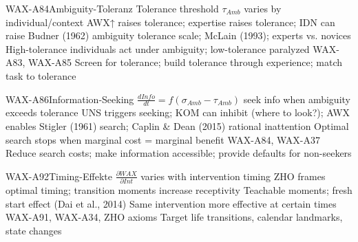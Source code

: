\begin{axiomspec}{WAX-A84}{Ambiguity-Toleranz}
 Tolerance threshold $\tau_{Amb}$ varies by individual/context
 AWX↑ raises tolerance; expertise raises tolerance; IDN can raise
 Budner (1962) ambiguity tolerance scale; McLain (1993); experts vs. novices
 High-tolerance individuals act under ambiguity; low-tolerance paralyzed
 WAX-A83, WAX-A85
 Screen for tolerance; build tolerance through experience; match task to tolerance
\end{axiomspec}


\begin{axiomspec}{WAX-A86}{Information-Seeking}
 $\frac{dInfo}{dt} = f(\sigma_{Amb} - \tau_{Amb})$ seek info when ambiguity exceeds tolerance
 UNS triggers seeking; KOM can inhibit (where to look?); AWX enables
 Stigler (1961) search; Caplin \& Dean (2015) rational inattention
 Optimal search stops when marginal cost = marginal benefit
 WAX-A84, WAX-A37
 Reduce search costs; make information accessible; provide defaults for non-seekers
\end{axiomspec}


\begin{axiomspec}{WAX-A92}{Timing-Effekte}
 $\frac{\partial WAX}{\partial Int}$ varies with intervention timing
 ZHO frames optimal timing; transition moments increase receptivity
 Teachable moments; fresh start effect (Dai et al., 2014)
 Same intervention more effective at certain times
 WAX-A91, WAX-A34, ZHO axioms
 Target life transitions, calendar landmarks, state changes
\end{axiomspec}


